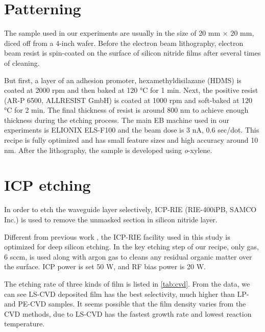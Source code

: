 \section{Patterning}
The sample used in our experiments are usually in the size of 20 mm $\times$ 20 mm, diced off from a 4-inch wafer. Before the electron beam lithography, electron beam resist is spin-coated on the surface of silicon nitride films after several times of cleaning. 

But first, a layer of an adhesion promoter, hexamethyldisilazane (HDMS) is coated at 2000 rpm and then baked at 120 \si{\celsius} for 1 min. Next, the positive resist (AR-P 6500, ALLRESIST GmbH) is coated at 1000 rpm and soft-baked at 120 \si{\celsius} for 2 min. The final thickness of resist is around 800 nm to achieve enough thickness during the etching process. The main EB machine used in our experiments is ELIONIX ELS-F100 and the beam dose is 3 nA, 0.6 sec/dot. This recipe is fully optimized and has small feature sizes and high accuracy around 10 nm. After the lithography, the sample is developed using \textit{o}-xylene. 


\section{ICP etching}

In order to etch the waveguide layer selectively, ICP-RIE (RIE-400iPB, SAMCO Inc.) is used to remove the unmasked section in silicon nitride layer.

Different from previous work \cite{Yusuke2017}, the ICP-RIE facility used in this study is optimized for deep silicon etching. In the key etching step of our recipe, only  gas, 6 sccm, is used along with argon gas to cleans any residual organic matter over the surface. ICP power is set 50 W, and RF bias power is 20 W.

The etching rate of three kinds of film is listed in \autoref{tab:cvd}. From the data, we can see LS-CVD deposited film has the best selectivity, much higher than LP- and PE-CVD samples. It seems possible that the film density varies from the CVD methods, due to LS-CVD has the fastest growth rate and lowest reaction temperature.

